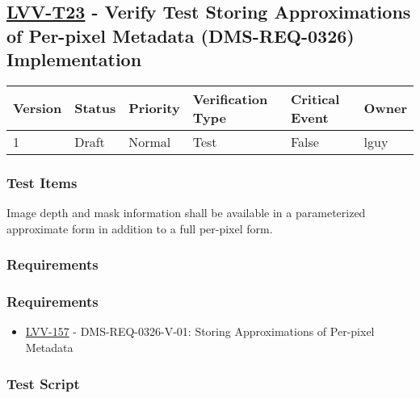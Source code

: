 \hypertarget{lvv-t23---verify-test-storing-approximations-of-per-pixel-metadata-dms-req-0326-implementation}{%
\subsection{\texorpdfstring{\href{https://jira.lsstcorp.org/secure/Tests.jspa\#/testCase/LVV-T23}{LVV-T23}
- Verify Test Storing Approximations of Per-pixel Metadata
(DMS-REQ-0326)
Implementation}{LVV-T23 - Verify Test Storing Approximations of Per-pixel Metadata (DMS-REQ-0326) Implementation}}\label{lvv-t23---verify-test-storing-approximations-of-per-pixel-metadata-dms-req-0326-implementation}}

\begin{longtable}[]{@{}llllll@{}}
\toprule
Version & Status & Priority & Verification Type & Critical Event &
Owner\tabularnewline
\midrule
\endhead
1 & Draft & Normal & Test & False & lguy\tabularnewline
\bottomrule
\end{longtable}

\hypertarget{test-items-32}{%
\subsubsection{Test Items}\label{test-items-32}}

Image depth and mask information shall be available in a parameterized
approximate form in addition to a full per-pixel form.

\hypertarget{requirements-64}{%
\subsubsection{Requirements}\label{requirements-64}}

\hypertarget{requirements-65}{%
\subsubsection{Requirements}\label{requirements-65}}

\begin{itemize}
\tightlist
\item
  \href{https://jira.lsstcorp.org/browse/LVV-157}{LVV-157} -
  DMS-REQ-0326-V-01: Storing Approximations of Per-pixel Metadata
\end{itemize}

\hypertarget{test-script-32}{%
\subsubsection{Test Script}\label{test-script-32}}

